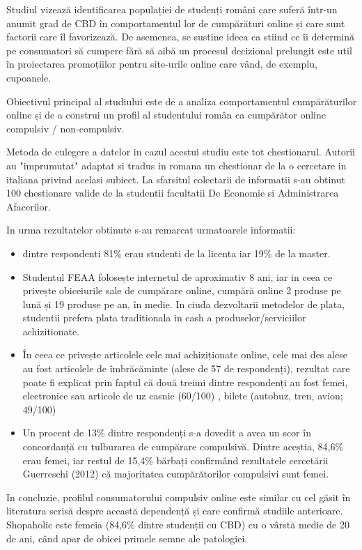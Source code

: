 \documentclass[a4paper, 12pt]{article}
\begin{document}
	\quad Studiul vizează identificarea  populației de studenți români care suferă într-un anumit grad de CBD în comportamentul lor de cumpărături online și care sunt factorii care îl favorizează. De asemenea, se sustine ideea ca stiind ce îi determină pe consumatori să cumpere fără să aibă un procesul decizional prelungit este util în proiectarea promoțiilor pentru site-urile online care vând, de exemplu, cupoanele.  
	
	\quad Obiectivul principal al studiului este de a analiza comportamentul cumpărăturilor online și de a construi un profil al studentului român ca cumpărător online compulsiv / non-compulsiv.
	
	\quad Metoda de culegere a datelor in cazul acestui studiu este tot chestionarul. Autorii au "imprumutat" adaptat si tradus in romana un chestionar de la o cercetare in italiana privind acelasi subiect. La sfarsitul colectarii de informatii s-au obtinut 100 chestionare valide de la studentii facultatii De Economie si Administrarea Afacerilor. 
	
	\qquad In urma rezultatelor obtinute s-au remarcat urmatoarele informatii: 
		\begin{itemize}
	\item dintre respondenti 81\% erau studenti de la licenta iar 19\% de la master. 
	\item Studentul FEAA folosește internetul de aproximativ 8 ani, iar in ceea ce privește obiceiurile sale de cumpărare online, cumpără online 2 produse pe lună și 19 produse pe an, în medie. In ciuda dezvoltarii metodelor de plata, studentii prefera plata traditionala in cash a produselor/serviciilor achizitionate.
	 \item În ceea ce privește articolele cele mai achiziționate online, cele mai des alese au fost articolele de îmbrăcăminte (alese de 57 de respondenți), rezultat care poate fi explicat prin faptul că două treimi dintre respondenți au fost femei, electronice sau articole de uz casnic (60/100) , bilete (autobuz, tren, avion; 49/100)
	\item Un procent de 13\% dintre respondenți s-a dovedit a avea un scor în concordanță cu tulburarea de cumpărare compulsivă. Dintre aceștia, 84,6\% erau femei, iar restul de 15,4\% bărbați confirmând rezultatele cercetării Guerreschi (2012) că majoritatea cumpărătorilor compulsivi sunt femei.
\end{itemize}
		\qquad In concluzie, profilul consumatorului compulsiv online este similar cu cel găsit în literatura scrisă despre această dependență și care confirmă studiile anterioare. Shopaholic este femeia (84,6\% dintre studenții cu CBD) cu o vârstă medie de 20 de ani, când apar de obicei primele semne ale patologiei.
		
\end{document}
